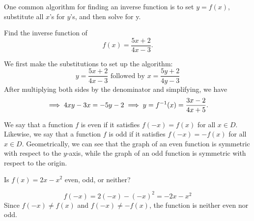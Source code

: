 One common algorithm for finding an inverse function is to set $y = f(x)$, substitute all $x$'s for $y$'s, and then solve for y.
\begin{example}
    Find the inverse function of 
    \begin{equation*}
        f(x) = \frac{5x + 2}{4x - 3}.
    \end{equation*}
\end{example}
\begin{answer}
    We first make the substitutions to set up the algorithm:
    \begin{equation*}
        y = \frac{5x + 2}{4x - 3} \text{ followed by }
        x = \frac{5y + 2}{4y - 3}
    \end{equation*}
    After multiplying both sides by the denominator and simplifying, we have
    \begin{equation*}
        \implies 4xy - 3x = -5y - 2 \\
        \implies y = f^{-1}(x) = \frac{3x - 2}{4x + 5}.
    \end{equation*}
\end{answer}

We say that a function $f$ is even if it satisfies $f(-x) = f(x)$ for all $x \in D$.
Likewise, we say that a function $f$ is odd if it satisfies $f(-x) = -f(x)$ for all $x \in D$. 
Geometrically, we can see that the graph of an even function is symmetric with respect to the $y$-axis, while the graph of an odd function is symmetric with respect to the origin. 

\begin{example}
    Is $f(x) = 2x - x^2$ even, odd, or neither?
\end{example}
\begin{answer}
    \begin{equation*}
        f(-x) = 2(-x) - (-x)^2 = -2x - x^2
    \end{equation*}
    Since $f(-x) \neq f(x)$ and $f(-x) \neq -f(x)$, the function is neither even nor odd.
\end{answer}